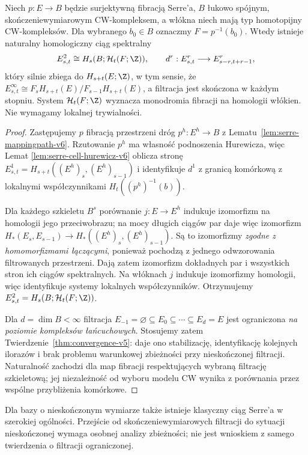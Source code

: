 \begin{twierdzenie}
\label{thm:serre-general-v6}
Niech $p:E\to B$ będzie surjektywną fibracją Serre'a,
$B$ łukowo spójnym, skończeniewymiarowym CW-kompleksem,
a włókna niech mają typ homotopijny CW-kompleksów.
Dla wybranego $b_0\in B$ oznaczmy $F=p^{-1}(b_0)$.
Wtedy istnieje naturalny homologiczny ciąg spektralny
\[
E^2_{s,t}\cong H_s(B;\mathcal H_t(F;\Z)),\qquad
 d^r:E^r_{s,t}\longrightarrow E^r_{s-r,t+r-1},
\]
który silnie zbiega do $H_{s+t}(E;\Z)$, w tym sensie, że
$E^\infty_{s,t}\cong F_sH_{s+t}(E)/F_{s-1}H_{s+t}(E)$,
a filtracja jest skończona w każdym stopniu.
System $\mathcal H_t(F;\Z)$ wyznacza monodromia fibracji
na homologii włókien. Nie wymagamy lokalnej trywialności.
\end{twierdzenie}
\begin{proof}
Zastępujemy $p$ fibracją przestrzeni dróg $p^h:E^h\to B$
z Lematu~\ref{lem:serre-mappingpath-v6}. Rzutowanie $p^h$
ma własność podnoszenia Hurewicza, więc Lemat
\ref{lem:serre-cell-hurewicz-v6} oblicza stronę
$E^1_{s,t}=H_{s+t}((E^h)_s,(E^h)_{s-1})$
i identyfikuje $d^1$ z granicą komórkową z lokalnymi
współczynnikami $H_t((p^h)^{-1}(b))$.

Dla każdego szkieletu $B^s$ porównanie $j:E\to E^h$
indukuje izomorfizm na homologii jego przeciwobrazu;
na mocy długich ciągów par daje więc izomorfizm
$H_* (E_s,E_{s-1})\to H_*((E^h)_s,(E^h)_{s-1})$.
Są to izomorfizmy \emph{zgodne z homomorfizmami łączącymi},
ponieważ pochodzą z jednego odwzorowania filtrowanych przestrzeni.
Dają zatem izomorfizm dokładnych par i wszystkich
stron ich ciągów spektralnych. Na włóknach $j$ indukuje
izomorfizmy homologii, więc identyfikuje systemy
lokalnych współczynników. Otrzymujemy
$E^2_{s,t}=H_s(B;\mathcal H_t(F;\Z))$.

Dla $d=\dim B<\infty$ filtracja
$E_{-1}=\varnothing\subseteq E_0\subseteq\cdots
\subseteq E_d=E$ jest ograniczona \emph{na poziomie
kompleksów łańcuchowych}. Stosujemy zatem
Twierdzenie~\ref{thm:convergence-v5}: daje ono stabilizację,
identyfikację kolejnych ilorazów i brak problemu
warunkowej zbieżności przy nieskończonej filtracji.
Naturalność zachodzi dla map fibracji respektujących
wybraną filtrację szkieletową; jej niezależność od wyboru
modelu CW wynika z porównania przez wspólne
przybliżenia komórkowe.
\end{proof}
\begin{uwaga}
Dla bazy o nieskończonym wymiarze także istnieje klasyczny
ciąg Serre'a w szerokiej ogólności. Przejście od
skończeniewymiarowych filtracji do sytuacji nieskończonej
wymaga osobnej analizy zbieżności; nie jest wnioskiem
z samego twierdzenia o filtracji ograniczonej.
\end{uwaga}


